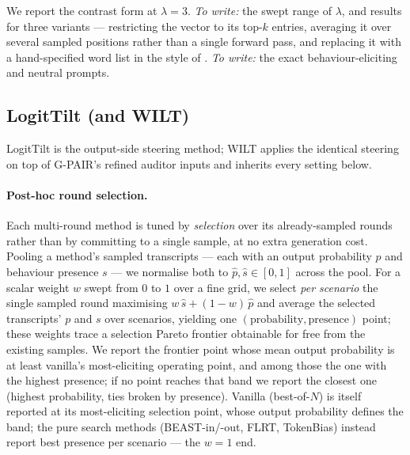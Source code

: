 \documentclass{article}
\theoremstyle{plain}
\theoremstyle{definition}
\theoremstyle{remark}
\begin{document}
We report the contrast form at $\lambda = 3$. \emph{To write:} the swept range of $\lambda$, and results for three variants --- restricting the vector to its top-$k$ entries, averaging it over several sampled positions rather than a single forward pass, and replacing it with a hand-specified word list in the style of \citet{zhang2023safety}. \emph{To write:} the exact behaviour-eliciting and neutral prompts.

\subsection{LogitTilt (and WILT)}\label{app:logittilt}
LogitTilt is the output-side steering method; WILT applies the identical steering on top of G-PAIR's refined auditor inputs and inherits every setting below.

\paragraph{Post-hoc round selection.} Each multi-round method is tuned by \emph{selection} over its already-sampled rounds rather than by committing to a single sample, at no extra generation cost. Pooling a method's sampled transcripts --- each with an output probability $p$ and behaviour presence $s$ --- we normalise both to $\hat p, \hat s \in [0, 1]$ across the pool. For a scalar weight $w$ swept from $0$ to $1$ over a fine grid, we select \emph{per scenario} the single sampled round maximising $w\,\hat s + (1 - w)\,\hat p$ and average the selected transcripts' $p$ and $s$ over scenarios, yielding one $(\text{probability}, \text{presence})$ point; these weights trace a selection Pareto frontier obtainable for free from the existing samples. We report the frontier point whose mean output probability is at least vanilla's most-eliciting operating point, and among those the one with the highest presence; if no point reaches that band we report the closest one (highest probability, ties broken by presence). Vanilla (best-of-$N$) is itself reported at its most-eliciting selection point, whose output probability defines the band; the pure search methods (BEAST-in/-out, FLRT, TokenBias) instead report best presence per scenario --- the $w = 1$ end.
\end{document}
